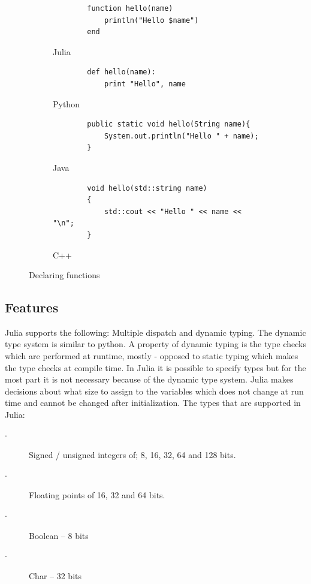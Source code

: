 \documentclass[a4paper,11pt]{article}
\begin{document}
\begin{figure}
	\centering
	\begin{subfigure}[b]{0.7\textwidth}
		\centering
		\begin{lstlisting}
		function hello(name)
			println("Hello $name")
		end
		\end{lstlisting}
		\caption{Julia}
	\end{subfigure}
	\begin{subfigure}[b]{0.7\textwidth}
		\centering
		\begin{lstlisting}
		def hello(name):
			print "Hello", name
		\end{lstlisting}
		\caption{Python}
	\end{subfigure}	
	\begin{subfigure}[b]{0.7\textwidth}
		\centering
		\begin{lstlisting}
		public static void hello(String name){
			System.out.println("Hello " + name);
		}
		\end{lstlisting}
		\caption{Java}
	\end{subfigure}
	\begin{subfigure}[b]{0.7\textwidth}
		\centering
		\begin{lstlisting}
		void hello(std::string name)
		{
			std::cout << "Hello " << name << "\n";
		}
		\end{lstlisting}
		\caption{C++}
	\end{subfigure}
	\caption{Declaring functions}
	\label{function}
\end{figure}

\subsection{Features}
Julia supports the following: Multiple dispatch and dynamic typing. The dynamic type system is similar to python. A property of dynamic typing is the type checks which are performed at runtime, mostly - opposed to static typing which makes the type checks at compile time. In Julia it is possible to specify types but for the most part it is not necessary because of the dynamic type system. Julia makes decisions about what size to assign to the variables which does not change at run time and cannot be changed after initialization. The types that are supported in Julia:
\begin{description}
	\item[$\cdot$] Signed / unsigned integers of; 8, 16, 32, 64 and 128 bits.
	\item[$\cdot$] Floating points of 16, 32 and 64 bits.  
	\item[$\cdot$] Boolean – 8 bits 
	\item[$\cdot$] Char – 32 bits 
\end{description}
\end{document}
